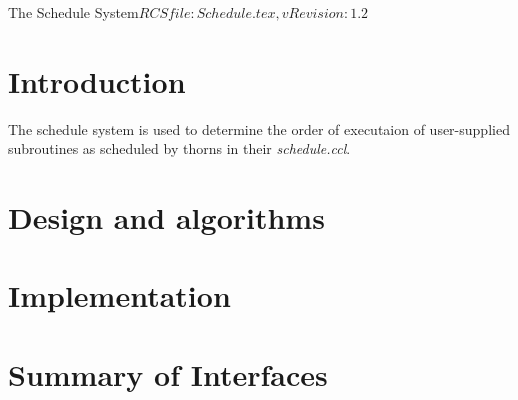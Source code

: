 %   

\begin{cactuspart}{9}{The Schedule System}{$RCSfile: Schedule.tex,v $}{$Revision: 1.2 $}
\renewcommand{\thepage}{\Alph{part}\arabic{page}}

\chapter{Introduction}

The schedule system is used to determine the order of executaion of
user-supplied subroutines as scheduled by thorns in their {\em schedule.ccl}.

\chapter{Design and algorithms}

\chapter{Implementation}

\chapter{Summary of Interfaces}

\end{cactuspart}

